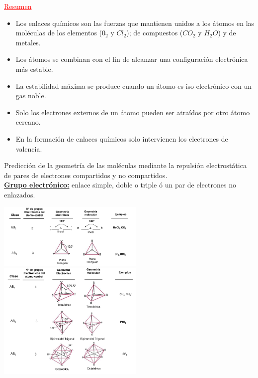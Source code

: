         \begin{center} \textcolor{red}{\underline{Resumen}} \end{center}
        \begin{itemize}
            \item Los enlaces químicos son las fuerzas que mantienen unidos a los átomos en las moléculas de los elementos ($0_2$ y $Cl_2$); de compuestos ($CO_2$ y $H_2O$) y de metales.
            \item Los átomos se combinan con el fin de alcanzar una configuración electrónica más estable.
            \item La estabilidad máxima se produce cuando un átomo es iso-electrónico con un gas noble.
            \item Solo los electrones externos de un átomo pueden ser atraídos por otro átomo cercano.
            \item En la formación de enlaces químicos solo intervienen los electrones de valencia.
        \end{itemize}
    \sangria{} Predicción de la geometría de las moléculas mediante la repulsión electrostática de pares de electrones compartidos y no compartidos. \\[10pt]
    \sangria{} \textbf{\underline{Grupo electrónico:}} enlace simple, doble o triple ó un par de electrones no enlazados. \\[10pt]
        \begin{center}
            \includegraphics[width=7cm]{./imagenes/geometriaElectronica1.png}
            \includegraphics[width=7cm]{./imagenes/geometriaElectronica2.png}
        \end{center}
